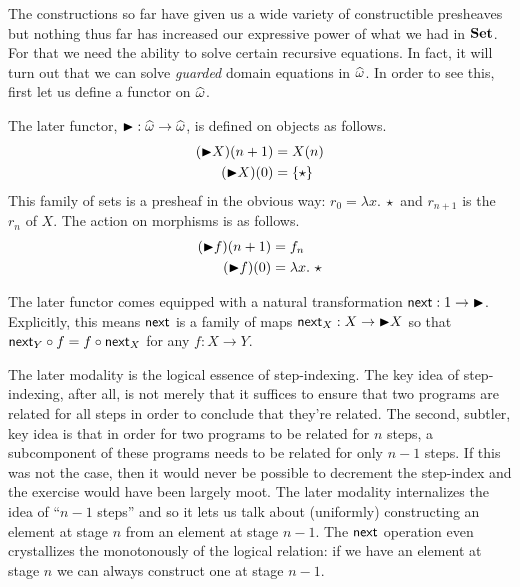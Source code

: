 The constructions so far have given us a wide variety of constructible
presheaves but nothing thus far has increased our expressive power of
what we had in $\mathbf{Set}$. For that we need the ability to solve certain
recursive equations. In fact, it will turn out that we can solve
\emph{guarded} domain equations in $\widehat{\omega}$. In order to
see this, first let us define a functor on $\widehat{\omega}$.
\begin{defn}
  The later functor,
  ${\blacktriangleright} : \widehat{\omega} \to \widehat{\omega}$, is defined
  on objects as follows.
  \begin{align*}
    ({\blacktriangleright} X)(n + 1) &= X(n)\\
    ({\blacktriangleright} X)(0) &= \{\star\}
  \end{align*}
  This family of sets is a presheaf in the obvious way:
  $r_0 = \lambda x.\ \star$ and $r_{n + 1}$ is the $r_n$ of $X$. The
  action on morphisms is as follows.
  \begin{align*}
    ({\blacktriangleright} f)(n + 1) &= f_n\\
    ({\blacktriangleright} f)(0) &= \lambda x.\ \star
  \end{align*}

  The later functor comes equipped with a natural transformation
  $\mathsf{next} : 1 \to {\blacktriangleright}$. Explicitly, this means $\mathsf{next}$ is a family
  of maps $\mathsf{next}_X : X \to {\blacktriangleright} X$ so that
  $\mathsf{next}_Y \circ f = f \circ \mathsf{next}_X$ for any $f : X \to Y$.
\end{defn}
The later modality is the logical essence of step-indexing. The key
idea of step-indexing, after all, is not merely that it suffices to
ensure that two programs are related for all steps in order to
conclude that they're related. The second, subtler, key idea is that
in order for two programs to be related for $n$ steps, a subcomponent
of these programs needs to be related for only $n - 1$ steps. If this
was not the case, then it would never be possible to decrement the
step-index and the exercise would have been largely moot. The later
modality internalizes the idea of ``$n - 1$ steps'' and so it lets us
talk about (uniformly) constructing an element at stage $n$ from an
element at stage $n - 1$. The $\mathsf{next}$ operation even crystallizes the
monotonously of the logical relation: if we have an element at stage
$n$ we can always construct one at stage $n - 1$.

